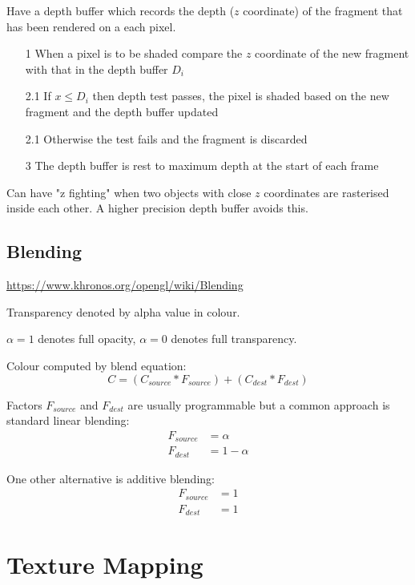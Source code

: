 \documentclass[a4paper]{article}
\begin{document}
Have a depth buffer which records the depth ($z$ coordinate) of the fragment
that has been rendered on a each pixel.

\begin{enumerate}
  \item[1]
    When a pixel is to be shaded compare the $z$ coordinate of the new fragment
    with that in the depth buffer $D_{i}$

  \item[2.1]
    If $x \leq D_{i}$ then depth test passes, the pixel is shaded based on the
    new fragment and the depth buffer updated

  \item[2.1]
    Otherwise the test fails and the fragment is discarded

  \item[3]
    The depth buffer is rest to maximum depth at the start of each frame

\end{enumerate}

Can have "z fighting" when two objects with close $z$ coordinates are rasterised
inside each other. A higher precision depth buffer avoids this.

\subsection{Blending}

\url{https://www.khronos.org/opengl/wiki/Blending}

Transparency denoted by alpha value in colour.

$\alpha = 1$ denotes full opacity, $\alpha = 0$ denotes full transparency.

Colour computed by blend equation:
\[
  C = (C_{source} * F_{source}) + (C_{dest} * F_{dest})
\]

Factors $F_{source}$ and $F_{dest}$ are usually programmable but a common
approach is standard linear blending:
\begin{align*}
  F_{source} &= \alpha \\
  F_{dest} &= 1 - \alpha
\end{align*}

One other alternative is additive blending:
\begin{align*}
  F_{source} &= 1 \\
  F_{dest} &= 1
\end{align*}

\section{Texture Mapping}
\end{document}
